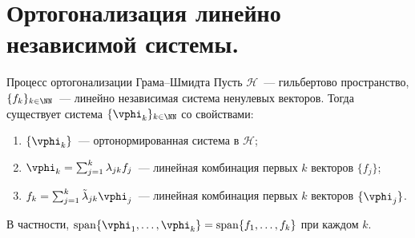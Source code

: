 
\section{Ортогонализация линейно независимой системы.}

\begin{Theorem}{Процесс ортогонализации Грама--Шмидта}{}
	Пусть $\mathcal{H}$~--- гильбертово пространство, $\{f_k\}_{k \in \NN}$~--- линейно независимая система ненулевых векторов. Тогда существует система $\{\vphi_k\}_{k \in \NN}$ со свойствами:
	\begin{enumerate}
		\item $\{\vphi_k\}$~--- ортонормированная система в $\mathcal{H}$;
		\item $\vphi_k = \sum_{j=1}^{k} \lambda_{jk} f_j$~--- линейная комбинация первых $k$ векторов $\{f_j\}$;
		\item $f_k = \sum_{j=1}^{k} \tilde{\lambda}_{jk} \vphi_j$~--- линейная комбинация первых $k$ векторов $\{\vphi_j\}$.
	\end{enumerate}
	В частности, $\operatorname{span}\{\vphi_1, \ldots, \vphi_k\} = \operatorname{span}\{f_1, \ldots, f_k\}$ при каждом $k$.
\end{Theorem}

